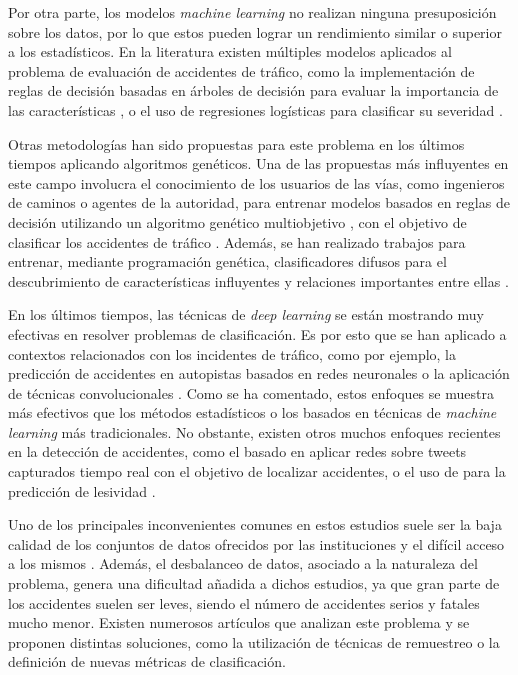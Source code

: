 Por otra parte, los modelos \textit{machine learning} no realizan ninguna presuposición sobre los datos, por lo que estos pueden lograr un rendimiento similar o superior a los estadísticos. En la literatura existen múltiples modelos aplicados al problema de evaluación de accidentes de tráfico, como la implementación de reglas de decisión basadas en árboles de decisión para evaluar la importancia de las características \cite{ArbolDecisionSeveridadDeAccidentes}, o el uso de regresiones logísticas para clasificar su severidad \cite{LogisticRegressionPrediccionAccidentes}.

Otras metodologías han sido propuestas para este problema en los últimos tiempos aplicando algoritmos genéticos. Una de las propuestas más influyentes en este campo involucra el conocimiento de los usuarios de las vías, como ingenieros de caminos o agentes de la autoridad, para entrenar modelos basados en reglas de decisión utilizando un algoritmo genético multiobjetivo , con el objetivo de clasificar los accidentes de tráfico \cite{NSGAIIAccidentPrediction}. Además, se han realizado trabajos para entrenar, mediante programación genética, clasificadores difusos para el descubrimiento de características influyentes y relaciones importantes entre ellas \cite{GeneticProgrammingAccidents}.

En los últimos tiempos, las técnicas de \textit{deep learning} se están mostrando muy efectivas en resolver problemas de clasificación. Es por esto que se han aplicado a contextos relacionados con los incidentes de tráfico, como por ejemplo, la predicción de accidentes en autopistas basados en redes neuronales \cite{RedNeuronalAutopistaAccidentes} o la aplicación de técnicas convolucionales \cite{OtraPrediccionConCNNs}. Como se ha comentado, estos enfoques se muestra más efectivos que los métodos estadísticos o los basados en técnicas de \textit{machine learning} más tradicionales. No obstante, existen otros muchos enfoques recientes en la detección de accidentes, como el basado en aplicar redes  sobre tweets capturados tiempo real \cite{DeteccionDeAccidentesPorTweets} con el objetivo de localizar accidentes, o el uso de  para la predicción de lesividad \cite{RNNAccidentSeverityPrediction}.


Uno de los principales inconvenientes comunes en estos estudios suele ser la baja calidad de los conjuntos de datos ofrecidos por las instituciones y el difícil acceso a los mismos \cite{ImportanciaDeBajaCalidadActualmenteDeDatasets}. Además, el desbalanceo de datos, asociado a la naturaleza del problema, genera una dificultad añadida a dichos estudios, ya que gran parte de los accidentes suelen ser leves, siendo el número de accidentes serios y fatales mucho menor. Existen numerosos artículos que analizan este problema y se proponen distintas soluciones, como la utilización de técnicas de remuestreo \cite{ItalianoMetricasDesbalanceo} o la definición de nuevas métricas de clasificación.


